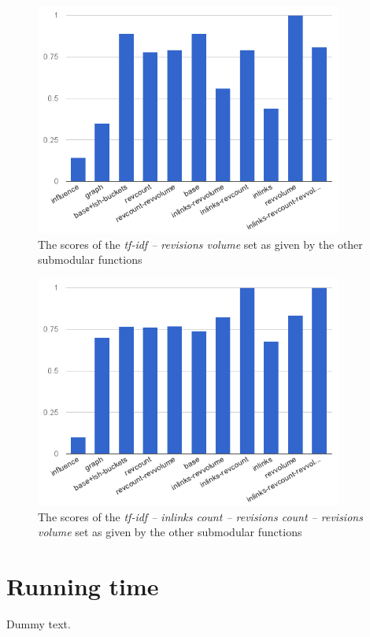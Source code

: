 \begin{figure}
  \centering
  \includegraphics[width=0.9\textwidth,natwidth=555,natheight=419]{images/rv.png}
  \caption{The scores of the \emph{tf-idf -- revisions volume} set as given by
  the other submodular functions}
  \label{img:rv}
\end{figure}

\begin{figure}
  \centering
  \includegraphics[width=0.9\textwidth,natwidth=555,natheight=419]{images/inl-rc-rv.png}
  \caption{The scores of the \emph{tf-idf -- inlinks count -- revisions count
  -- revisions volume} set as given by the other submodular functions}
  \label{img:}
\end{figure}

\section{Running time}

Dummy text.

